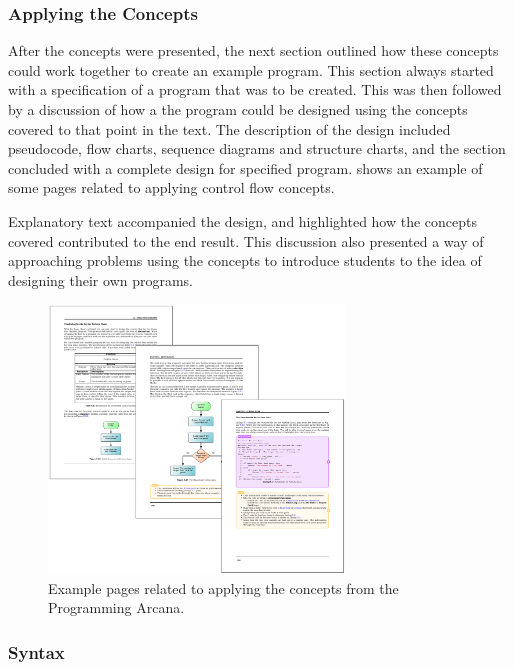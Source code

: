 
\subsubsection{Applying the Concepts} %
\label{par:applying_the_concepts_}

After the concepts were presented, the next section outlined how these concepts could work together to create an example program. This section always started with a specification of a program that was to be created. This was then followed by a discussion of how a the program could be designed using the concepts covered to that point in the text. The description of the design included pseudocode, flow charts, sequence diagrams and structure charts, and the section concluded with a complete design for specified program.  shows an example of some pages related to applying control flow concepts.

Explanatory text accompanied the design, and highlighted how the concepts covered contributed to the end result. This discussion also presented a way of approaching problems using the concepts to introduce students to the idea of designing their own programs.

\begin{figure}[hb]
  \centering
  \includegraphics[width=0.7\textwidth]{ArcanaApplying}
  \caption{Example pages related to applying the concepts from the Programming Arcana.}
  \label{fig:arcana_applying}
\end{figure}


\subsubsection{Syntax} %
\label{par:syntax}

